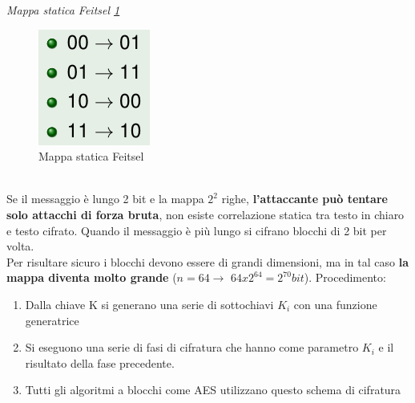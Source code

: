 \documentclass[12pt]{article}
\begin{document}
 				\textit{Mappa statica Feitsel \ref{fig:20}}\\
 				\begin{figure}[h!]
 					\centering
 					\includegraphics[scale=0.60]{img/staticmap.PNG}
 					\caption{Mappa statica Feitsel \label{fig:20}}
 				\end{figure}\\
 			
 				Se il messaggio è lungo 2 bit e la mappa $2^{2}$ righe, \textbf{l'attaccante può tentare solo attacchi di forza bruta}, non esiste correlazione statica tra testo in chiaro e testo cifrato. Quando il messaggio è più lungo si cifrano blocchi di 2 bit per volta.\\
 				Per risultare sicuro i blocchi devono essere di grandi dimensioni, ma in tal caso \textbf{la mappa diventa molto grande} ($n=64 \rightarrow$ $64x2^{64} = 2^{70} bit$). Procedimento:
 				\begin{enumerate}
 					\item Dalla chiave K si generano una serie di sottochiavi $K_{i}$ con una funzione generatrice
 					\item Si eseguono una serie di fasi di cifratura che hanno come parametro $K_{i}$ e il risultato della fase precedente.
 					\item Tutti gli algoritmi a blocchi come AES utilizzano questo schema di cifratura
 				\end{enumerate}
				
\end{document}

